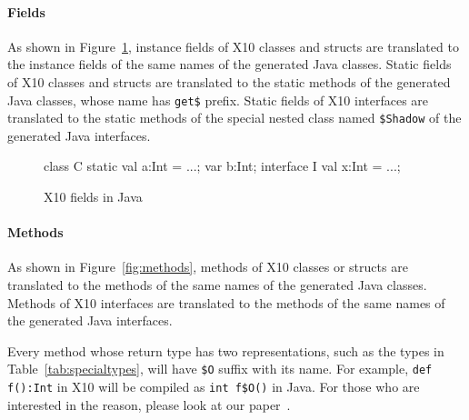 \paragraph{Fields}

As shown in Figure~\ref{fig:fields}, instance fields of X10 classes and structs are translated to the instance fields of the same names of the generated Java classes.
Static fields of X10 classes and structs are translated to the static methods of the generated Java classes, whose name has \verb|get$| prefix.
Static fields of X10 interfaces are translated to the static methods of the special nested class named \verb|$Shadow| of the generated Java interfaces.

\begin{figure}
\begin{xten}
class C {
  static val a:Int = ...;
  var b:Int;
}
interface I {
  val x:Int = ...;
}
\end{xten}
\caption{X10 fields in Java}
\label{fig:fields}
\end{figure}


\paragraph{Methods}

As shown in Figure~\ref{fig:methods}, methods of X10 classes or structs are translated to the methods of the same names of the generated Java classes.
Methods of X10 interfaces are translated to the methods of the same names of the generated Java interfaces.

Every method whose return type has two representations, such as the types in Table~\ref{tab:specialtypes}, will have \verb|$O| suffix with its name.
For example, \verb|def f():Int| in X10 will be compiled as \verb|int f$O()| in Java.
For those who are interested in the reason, please look at our paper~\cite{TakeuchiX1012}.

